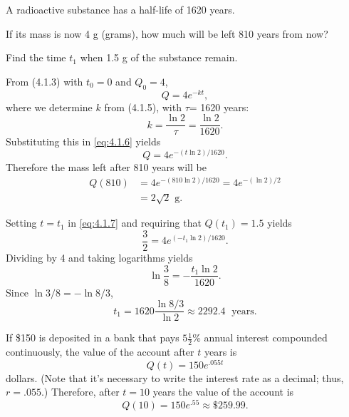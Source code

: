 \setcounter{example}{0}
\begin{example}
  \label{example:4.1.1} \rm A radioactive substance has a half-life of 1620 years.
  \begin{alist}
    \item %
    If its mass is now 4 g (grams), how much will be left 810 years from now?

    \item %
    Find the time $t_{1}$ when 1.5 g of the substance remain.
  \end{alist}
\end{example}
\setcounter{equation}{5}
\begin{examplesolution}
 From \textup{(4.1.3)} with $t_{0}=0$ and $Q_{0}=4$,
\begin{equation}
  \label{eq:4.1.6}Q=4e^{-kt},
\end{equation}
where we determine $k$ from \textup{(4.1.5)}, with $\tau$= 1620 years:
\[
  k=\frac{\ln2}{\tau}=\frac{\ln2}{1620}.
\]
Substituting this in \eqref{eq:4.1.6} yields
\begin{equation}
  \label{eq:4.1.7}Q=4e^{-(t\ln2)/1620}.
\end{equation}
Therefore the mass left after 810 years will be
\[
  \begin{array}{rl}
    Q(810) & =4e^{-(810\ln2)/1620}=4e^{-(\ln2)/2} \\
           & =2\sqrt{2}\mbox{ g}.
  \end{array}
\]

 Setting $t=t_{1}$ in \eqref{eq:4.1.7} and requiring that $Q(t_{1})=1.5$ yields
\[
  \frac{3}{2}=4e^{(-t_{1}\ln2)/1620}.
\]
Dividing by 4 and taking logarithms yields
\[
  \ln\frac{3}{8}=-\frac{t_{1}\ln2}{1620}.
\]
Since $\ln3/8=-\ln8/3$,
\[
  t_{1}=1620{\frac{\ln8/3}{\ln2}}\approx2292.4\;\mbox{ years}.
\]
\end{examplesolution}

\setcounter{example}{1}
\begin{example}
  \label{example:4.1.2} \rm If \$150 is deposited in a bank that pays $5{\frac{1}{2}}$\% annual
  interest compounded continuously, the value of the account after $t$ years is
  \[
    Q(t)=150e^{.055t}
  \]
  dollars. (Note that it's necessary to write the interest rate as a decimal; thus, $r=.055$.)
  Therefore, after $t=10$ years the value of the account is
  \[
    Q(10)=150e^{.55}\approx\$259.99.
  \]
\end{example}

